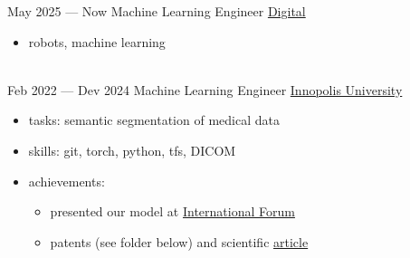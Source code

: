 \documentclass[letterpaper]{twentysecondcv} %
\begin{document}
\begin{twenty} %

        \twentyitem
        {May 2025 —}
        {Now}
        {Machine Learning Engineer}
        {  \href{https://tattelecom.digital/}{Digital}}
        {}
        {
        {\begin{itemize}
            \item robots, machine learning
        \end{itemize}}
        }
        \\
        \twentyitem
        {Feb 2022 —}
        {Dev 2024}
        {Machine Learning Engineer}
        {\href{https://innopolis.university/en/}{Innopolis University}}
        {}
        {
        {\begin{itemize}
            \item tasks: semantic segmentation of medical data
            \item skills: git, torch, python, tfs, DICOM
            \item achievements:
            {\begin{itemize}
                \item presented our model at {\href{https://inno-onco.ru/}{International Forum}}
                \item patents (see folder below) and scientific {\href{https://www.mdpi.com/2077-0383/15/9/3370}{article}}
            \end{itemize}
            }
        \end{itemize}}
        }
        \\


\end{twenty}
\end{document}
